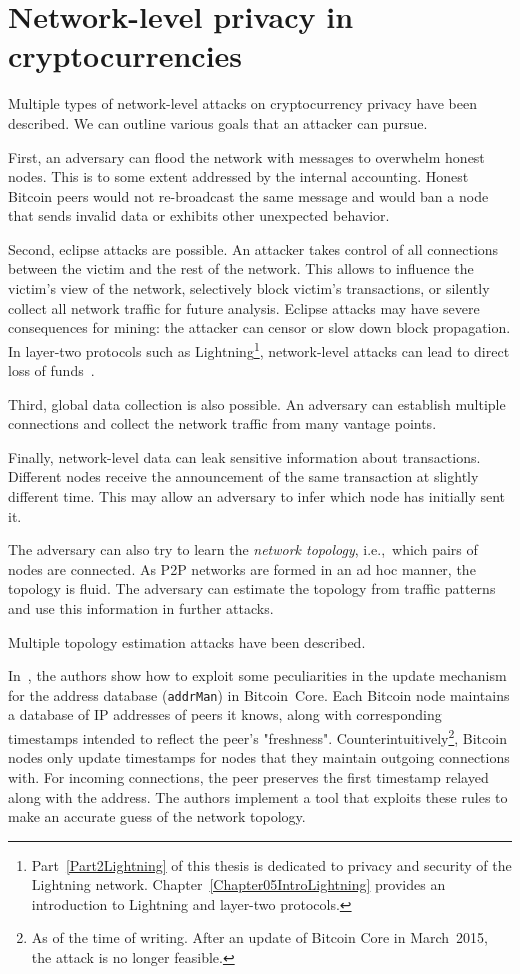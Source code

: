 \section{Network-level privacy in cryptocurrencies}

Multiple types of network-level attacks on cryptocurrency privacy have been described.
We can outline various goals that an attacker can pursue.

First, an adversary can flood the network with messages to overwhelm honest nodes.
This is to some extent addressed by the internal accounting.
Honest Bitcoin peers would not re-broadcast the same message and would ban a node that sends invalid data or exhibits other unexpected behavior.

Second, eclipse attacks are possible.
An attacker takes control of all connections between the victim and the rest of the network.
This allows to influence the victim's view of the network, selectively block victim's transactions, or silently collect all network traffic for future analysis.
Eclipse attacks may have severe consequences for mining: the attacker can censor or slow down block propagation.
In layer-two protocols such as Lightning\footnote{Part~\ref{Part2Lightning} of this thesis is dedicated to privacy and security of the Lightning network. Chapter~\ref{Chapter05IntroLightning} provides an introduction to Lightning and layer-two protocols.}, network-level attacks can lead to direct loss of funds~\cite{Riard2020}.

Third, global data collection is also possible.
An adversary can establish multiple connections and collect the network traffic from many vantage points.

Finally, network-level data can leak sensitive information about transactions.
Different nodes receive the announcement of the same transaction at slightly different time.
This may allow an adversary to infer which node has initially sent it.

The adversary can also try to learn the \textit{network topology}, i.e.,~which pairs of nodes are connected.
As P2P networks are formed in an ad hoc manner, the topology is fluid.
The adversary can estimate the topology from traffic patterns and use this information in further attacks.

Multiple topology estimation attacks have been described.

In~\cite{Miller2015}, the authors show how to exploit some peculiarities in the update mechanism for the address database (\texttt{addrMan}) in Bitcoin~Core.
Each Bitcoin node maintains a database of IP addresses of peers it knows, along with corresponding timestamps intended to reflect the peer's "freshness".
Counterintuitively\footnote{As of the time of writing. After an update of Bitcoin Core in March~2015, the attack is no longer feasible.}, Bitcoin nodes only update timestamps for nodes that they maintain outgoing connections with.
For incoming connections, the peer preserves the first timestamp relayed along with the address.
The authors implement a tool that exploits these rules to make an accurate guess of the network topology.

